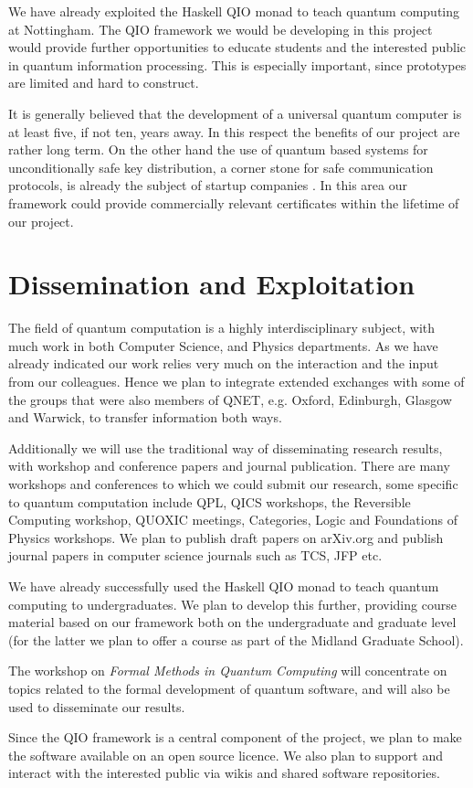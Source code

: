 \documentclass[a4paper]{article}
\begin{document}
We have already exploited the Haskell QIO monad to teach quantum
computing at Nottingham. The QIO framework we would be developing in
this project would provide further opportunities to educate students
and the interested public in quantum information processing. This is
especially important, since prototypes are limited and hard to
construct. 

It is generally believed that the development of a universal quantum
computer is at least five, if not ten, years away. In this respect the
benefits of our project are rather long term. On the other hand the
use of quantum based systems for unconditionally safe key
distribution, a corner stone for safe communication protocols, is
already the subject of startup companies . 
In this area our framework could provide commercially
relevant certificates within the lifetime of our project.

\section{Dissemination and Exploitation}

The field of quantum computation is a highly interdisciplinary
subject, with much work in both Computer Science, and Physics
departments. As we have already indicated our work relies very much on
the interaction and the input from our colleagues. Hence we plan to
integrate extended exchanges with 
some of the groups that were also
members of QNET, e.g. Oxford, Edinburgh, Glasgow and Warwick,
to transfer information both
ways. 

Additionally we will use the traditional way of disseminating
research results, with workshop and conference papers and journal
publication. There are many workshops and conferences to which we
could submit our research, some specific to quantum computation
include QPL, QICS workshops, the Reversible
Computing workshop, QUOXIC meetings, Categories, Logic and Foundations
of Physics workshops. We plan to publish draft papers on arXiv.org
and publish journal papers in computer science journals such as
TCS, JFP etc. 

We have already successfully used the Haskell QIO monad to teach
quantum computing to undergraduates. We plan to develop this further,
providing course material based on our framework both on the
undergraduate and graduate level (for the latter we plan to offer a
course as part of the Midland Graduate School).

The workshop on \emph{Formal Methods in Quantum Computing} will 
concentrate on topics related to the formal development of quantum
software, and will also be used to disseminate our results. 

Since the QIO framework is a central component of the project, we plan
to make the software available on an open source licence.  We also
plan to support and interact with the interested public via wikis and
shared software repositories.

{\small 
{}
}

% 
%  
\end{document}
